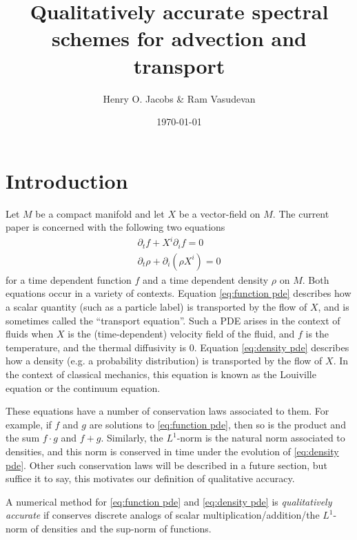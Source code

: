 \documentclass[final,leqno]{siamltex1213}
\title{Qualitatively accurate spectral schemes for advection and transport}
\author{Henry O. Jacobs \& Ram Vasudevan}
\date{\today}
\begin{document}
\maketitle


\section{Introduction}
\label{sec:intro}

Let $M$ be a compact manifold and let $X$ be a vector-field on $M$. The current paper is concerned with the following two equations
\begin{align}
	\partial_{t} f + X^{i} \partial_{i} f = 0 \label{eq:function pde} \\
	\partial_{t} \rho + \partial_{i} (\rho X^{i}) = 0 \label{eq:density pde}
\end{align}
for a time dependent function $f$ and a time dependent density $\rho$ on $M$.
Both equations occur in a variety of contexts.
Equation \eqref{eq:function pde} describes how a scalar quantity (such as a particle label) is transported by the flow of $X$, and is sometimes called the ``transport equation''.
Such a PDE arises in the context of fluids when $X$ is the (time-dependent) velocity field of the fluid, and $f$ is the temperature, and the thermal diffusivity is $0$.
Equation \eqref{eq:density pde} describes how a density (e.g. a probability distribution) is transported by the flow of $X$.
In the context of classical mechanics, this equation is known as the Louiville equation or the continuum equation.

These equations have a number of conservation laws associated to them.
For example, if $f$ and $g$ are solutions to \eqref{eq:function pde},
then so is the product and the sum $f\cdot g$ and $f+g$.
Similarly, the $L^{1}$-norm is the natural norm associated to densities, and this norm is conserved in time under the evolution of \eqref{eq:density pde}.
Other such conservation laws will be described in a future section, but suffice it to say, this motivates our definition of qualitative accuracy.

\begin{definition}
	    A numerical method for \eqref{eq:function pde} and \eqref{eq:density pde} is \emph{qualitatively accurate} if conserves discrete analogs of scalar multiplication/addition/the $L^{1}$-norm of densities and the sup-norm of functions.
\end{definition}
\end{document}
